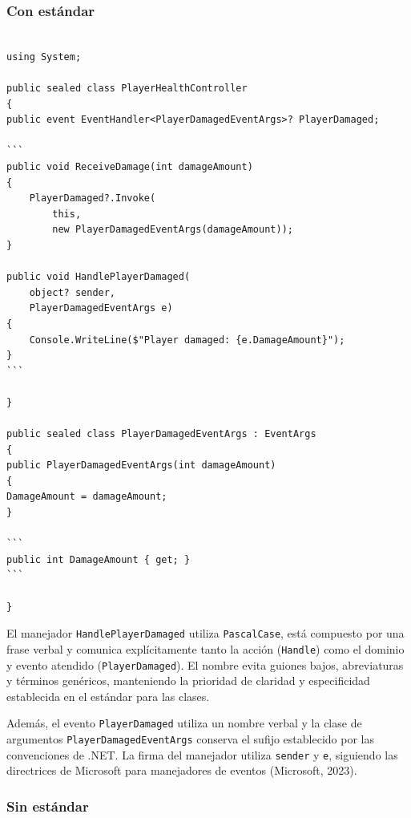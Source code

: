 \subsubsection{Con estándar}

\begin{lstlisting}[style=csharpstyle]

using System;

public sealed class PlayerHealthController
{
public event EventHandler<PlayerDamagedEventArgs>? PlayerDamaged;

```
public void ReceiveDamage(int damageAmount)
{
    PlayerDamaged?.Invoke(
        this,
        new PlayerDamagedEventArgs(damageAmount));
}

public void HandlePlayerDamaged(
    object? sender,
    PlayerDamagedEventArgs e)
{
    Console.WriteLine($"Player damaged: {e.DamageAmount}");
}
```

}

public sealed class PlayerDamagedEventArgs : EventArgs
{
public PlayerDamagedEventArgs(int damageAmount)
{
DamageAmount = damageAmount;
}

```
public int DamageAmount { get; }
```

}

\end{lstlisting}

El manejador \texttt{HandlePlayerDamaged} utiliza \texttt{PascalCase}, está compuesto por una frase verbal y comunica explícitamente tanto la acción (\texttt{Handle}) como el dominio y evento atendido (\texttt{PlayerDamaged}). El nombre evita guiones bajos, abreviaturas y términos genéricos, manteniendo la prioridad de claridad y especificidad establecida en el estándar para las clases.

Además, el evento \texttt{PlayerDamaged} utiliza un nombre verbal y la clase de argumentos \texttt{PlayerDamagedEventArgs} conserva el sufijo establecido por las convenciones de .NET. La firma del manejador utiliza \texttt{sender} y \texttt{e}, siguiendo las directrices de Microsoft para manejadores de eventos (Microsoft, 2023).

\subsubsection{Sin estándar}

